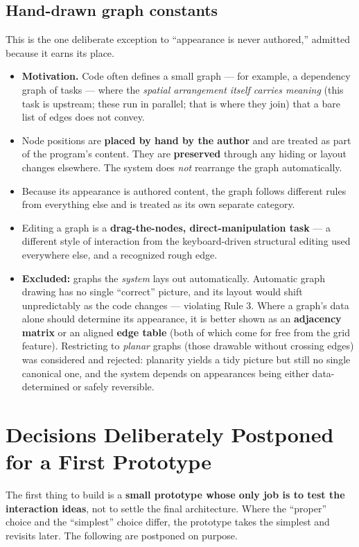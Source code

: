 \documentclass[11pt]{article}
\newcommand{\req}[1]{\textbf{\color{accent}#1}}
\begin{document}
\subsection{Hand-drawn graph constants}
\label{sec:graph}
This is the one deliberate exception to ``appearance is never authored,'' admitted because it earns its place.
\begin{itemize}[leftmargin=1.4em,itemsep=3pt]
  \item \textbf{Motivation.} Code often defines a small graph --- for example, a dependency graph of tasks --- where the \emph{spatial arrangement itself carries meaning} (this task is upstream; these run in parallel; that is where they join) that a bare list of edges does not convey.
  \item Node positions are \req{placed by hand by the author} and are treated as part of the program's content. They are \req{preserved} through any hiding or layout changes elsewhere. The system does \emph{not} rearrange the graph automatically.
  \item Because its appearance is authored content, the graph follows different rules from everything else and is treated as its own separate category.
  \item Editing a graph is a \req{drag-the-nodes, direct-manipulation task} --- a different style of interaction from the keyboard-driven structural editing used everywhere else, and a recognized rough edge.
  \item \textbf{Excluded:} graphs the \emph{system} lays out automatically. Automatic graph drawing has no single ``correct'' picture, and its layout would shift unpredictably as the code changes --- violating Rule 3. Where a graph's data alone should determine its appearance, it is better shown as an \req{adjacency matrix} or an aligned \req{edge table} (both of which come for free from the grid feature). Restricting to \emph{planar} graphs (those drawable without crossing edges) was considered and rejected: planarity yields a tidy picture but still no single canonical one, and the system depends on appearances being either data-determined or safely reversible.
\end{itemize}

\section{Decisions Deliberately Postponed for a First Prototype}
The first thing to build is a \req{small prototype whose only job is to test the interaction ideas}, not to settle the final architecture. Where the ``proper'' choice and the ``simplest'' choice differ, the prototype takes the simplest and revisits later. The following are postponed on purpose.
\end{document}
